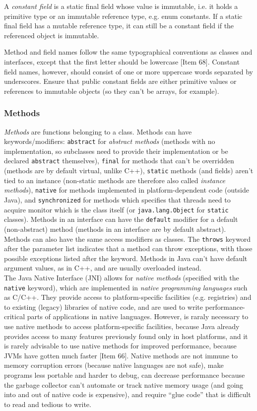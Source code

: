 \documentclass[8pt, table, xcdraw]{article}%
\begin{document}
A \emph{constant field} is a static final field whose value is immutable, i.e. it holds a primitive type or an immutable reference type, e.g. enum constants. If a static final field has a mutable reference type, it can still be a constant field if the referenced object is immutable.

Method and field names follow the same typographical conventions as classes and interfaces, except that the first letter should be lowercase [Item 68]. Constant field names, however, should consist of one or more uppercase words separated by underscores. Ensure that public constant fields are either primitive values or references to immutable objects (so they can't be arrays, for example).

\subsubsection{Methods}

\emph{Methods} are functions belonging to a class. Methods can have keywords/modifiers: \lstinline{abstract} for \emph{abstract methods} (methods with no implementation, so subclasses need to provide their implementation or be declared \lstinline{abstract} themselves), \lstinline{final} for methods that can't be overridden (methods are by default virtual, unlike C++), \lstinline{static} methods (and fields) aren't tied to an instance (non-static methods are therefore also called \emph{instance methods}), \lstinline{native} for methods implemented in platform-dependent code (outside Java), and \lstinline{synchronized} for methods which specifies that threads need to acquire monitor which is the class itself (or \lstinline{java.lang.Object} for \lstinline{static} classes). Methods in an interface can have the \lstinline{default} modifier for a default (non-abstract) method (methods in an interface are by default abstract). Methods can also have the same access modifiers as classes. The \lstinline{throws} keyword after the parameter list indicates that a method can throw exceptions, with those possible exceptions listed after the keyword. Methods in Java can't have default argument values, as in C++, and are usually overloaded instead.\\
The Java Native Interface (JNI) allows for \emph{native methods} (specified with the \lstinline{native} keyword), which are implemented in \emph{native programming languages} such as C/C++. They provide access to platform-specific facilities (e.g. registries) and to existing (legacy) libraries of native code, and are used to write performance-critical parts of applications in native languages. However, is raraly necessary to use native methods to access platform-specific facilities, because Java already provides access to many features previously found only in host platforms, and it is rarely advisable to use native methods for improved performance, because JVMs have gotten much faster [Item 66]. Native methods are not immune to memory corruption errors (because native languages are not safe), make programs less portable and harder to debug, can decrease performance because the garbage collector can’t automate or track native memory usage (and going into and out of native code is expensive), and require “glue code” that is difficult to read and tedious to write.
\end{document}
